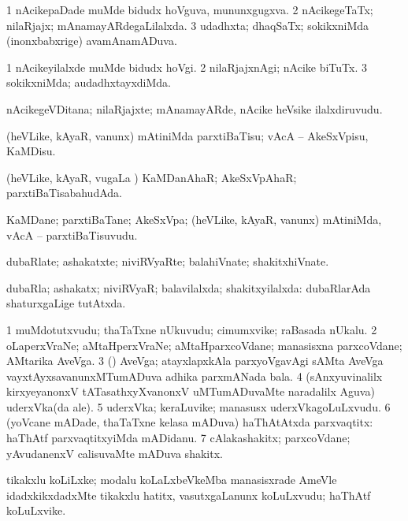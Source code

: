 \bentry
{}
\gl{\gu}
\bmng
\bnum
\num{1} nAcikepaDade muMde bidudx hoVguva, mununxgugxva. 
\num{2} nAcikegeTaTx; nilaRjajx; mAnamayARdegaLilalxda. 
\num{3} udadhxta; dhaqSaTx; sokikxniMda (inonxbabxrige) avamAnamADuva. 
\enum
\emng
\eentry

\bentry
{}
\gl{\kirxvi}
\bmng
\bnum
\num{1} nAcikeyilalxde muMde bidudx hoVgi. 
\num{2} nilaRjajxnAgi; nAcike biTuTx. 
\num{3} sokikxniMda; audadhxtayxdiMda. 
\enum
\emng
\eentry


\bentry
{}
\gl{\nA}
\bmng
nAcikegeVDitana; nilaRjajxte; mAnamayARde, nAcike heVsike ilalxdiruvudu. 
\emng
\eentry

\bentry
{}
\gl{\sakirx}
\bmng
(heVLike, kAyaR, \mo vanunx) mAtiniMda parxtiBaTisu; vAcA -- AkeSxVpisu, KaMDisu. 
\emng
\eentry

\bentry
{}
\gl{\gu}
\bmng
(heVLike, kAyaR, \mo vugaLa \vi) KaMDanAhaR; AkeSxVpAhaR; parxtiBaTisabahudAda. 
\emng
\eentry

\bentry
{}
\gl{\nA}
\bmng
KaMDane; parxtiBaTane; AkeSxVpa; (heVLike, kAyaR, \mo vanunx) mAtiniMda, vAcA -- parxtiBaTisuvudu. 
\emng
\eentry

\bentry
{}
\gl{\nA}
\bmng
dubaRlate; ashakatxte; niviRVyaRte; balahiVnate; shakitxhiVnate. 
\emng
\eentry

\bentry
{}
\gl{\gu}
\bmng
dubaRla; ashakatx; niviRVyaR; balavilalxda; shakitxyilalxda:  dubaRlarAda shaturxgaLige tutAtxda. 
\emng
\eentry

\bentry
{}
\gl{\nA}
\bmng
\bnum
\num{1} muMdotutxvudu; thaTaTxne nUkuvudu; cimumxvike; raBasada nUkalu. 
\num{2} oLaperxVraNe; aMtaHperxVraNe; aMtaHparxcoVdane; manasisxna parxcoVdane; AMtarika AveVga. 
\num{3} (\Bwvi) AveVga; atayxlapxkAla parxyoVgavAgi sAMta AveVga vayxtAyxsavanunxMTumADuva adhika parxmANada bala. 
\num{4} (sAnxyuvinalilx kirxyeyanonxV tATasathxyXvanonxV uMTumADuvaMte naradalilx Aguva) uderxVka(da ale). 
\num{5} uderxVka; keraLuvike; manasusx uderxVkagoLuLxvudu. 
\num{6} (yoVcane mADade, thaTaTxne kelasa mADuva) haThAtAtxda parxvaqtitx:  haThAtf parxvaqtitxyiMda mADidanu. 
\num{7} cAlakashakitx; parxcoVdane; yAvudanenxV calisuvaMte mADuva shakitx. 
\enum
\emng
\eentry

\bentry
{}
\gl{\nA}
\bmng
tikakxlu koLiLxke; modalu koLaLxbeVkeMba manasisxrade AmeVle idadxkikxdadxMte tikakxlu hatitx, vasutxgaLanunx koLuLxvudu; haThAtf koLuLxvike. 
\emng
\eentry

